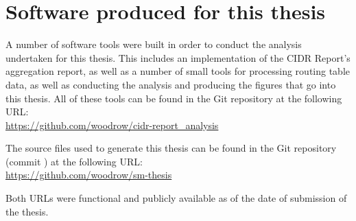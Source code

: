 \chapter{Software produced for this thesis}
\label{chap:opensource}

A number of software tools were built in order to conduct the analysis
undertaken for this thesis. This includes an implementation of the CIDR
Report's aggregation report, as well as a number of small tools for processing
routing table data, as well as conducting the analysis and producing the
figures that go into this thesis. All of these tools can be found in the Git
repository at the following URL:\\
\indent \url{https://github.com/woodrow/cidr-report_analysis}

\vspace{1em}

\noindent The source files used to generate this thesis can be found in the Git
repository (commit \GITHash) at the following URL:\\
\indent \url{https://github.com/woodrow/sm-thesis}

\vspace{1em}
\noindent Both URLs were functional and publicly available as of the date of
submission of the thesis.

